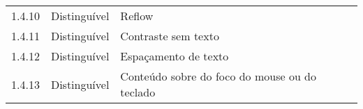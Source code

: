 \begin{table}[]
\begin{tabular}{lll}
 1.4.10          & Distinguível           & Reflow                                                                              \\
 
 1.4.11          & Distinguível           & Contraste sem texto                                                                 \\
 
 1.4.12          & Distinguível           & Espaçamento de texto                                                                \\
 
 1.4.13          & Distinguível           & Conteúdo sobre do foco do mouse ou do teclado                                       \\
\hline
\end{tabular}
\end{table}


